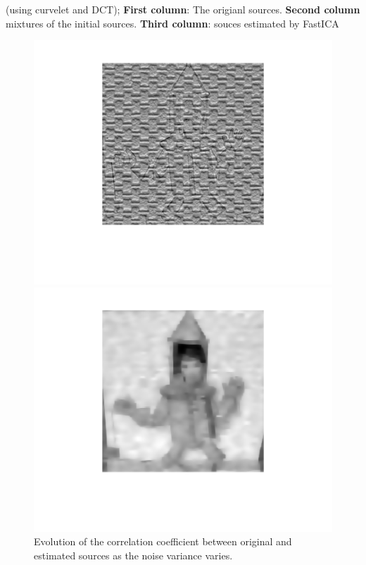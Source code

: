 \begin{center}
\begin{minipage}{0.33\linewidth}
\end{minipage}
\hfill
\caption{(using curvelet and DCT); \textbf{First column}: The origianl sources. \textbf{Second column} mixtures of the initial sources. \textbf{Third column}: souces estimated by FastICA}
\end{center}


\begin{figure}[H]
\centering
\begin{minipage}{0.5\linewidth}
\includegraphics[width=0.9\linewidth]{images/MCA_Texture.png}
\end{minipage}
\begin{minipage}{0.5\linewidth}
\includegraphics[width=0.9\linewidth]{images/MCA_Cartoon.png}
\end{minipage}
\caption{Evolution of the correlation coefficient between original and estimated sources as the noise variance varies.}
\label{imapint1}
\end{figure}

